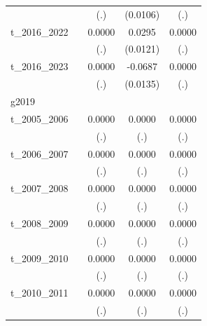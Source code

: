 \begin{table}[htbp]
\begin{tabular}{l*{4}{c}}
            &                     &         (.)         &    (0.0106)         &         (.)         \\
[1em]
t\_2016\_2022 &                     &      0.0000         &      0.0295\sym{**} &      0.0000         \\
            &                     &         (.)         &    (0.0121)         &         (.)         \\
[1em]
t\_2016\_2023 &                     &      0.0000         &     -0.0687\sym{***}&      0.0000         \\
            &                     &         (.)         &    (0.0135)         &         (.)         \\
\hline
g2019       &                     &                     &                     &                     \\
t\_2005\_2006 &                     &      0.0000         &      0.0000         &      0.0000         \\
            &                     &         (.)         &         (.)         &         (.)         \\
[1em]
t\_2006\_2007 &                     &      0.0000         &      0.0000         &      0.0000         \\
            &                     &         (.)         &         (.)         &         (.)         \\
[1em]
t\_2007\_2008 &                     &      0.0000         &      0.0000         &      0.0000         \\
            &                     &         (.)         &         (.)         &         (.)         \\
[1em]
t\_2008\_2009 &                     &      0.0000         &      0.0000         &      0.0000         \\
            &                     &         (.)         &         (.)         &         (.)         \\
[1em]
t\_2009\_2010 &                     &      0.0000         &      0.0000         &      0.0000         \\
            &                     &         (.)         &         (.)         &         (.)         \\
[1em]
t\_2010\_2011 &                     &      0.0000         &      0.0000         &      0.0000         \\
            &                     &         (.)         &         (.)         &         (.)         \\

\end{tabular}
\end{table}
